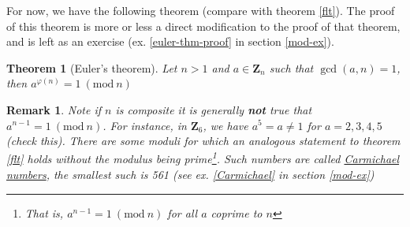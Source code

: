 \documentclass[12pt]{article}
\numberwithin{equation}{subsection}
\newtheorem{thm}[subsection]{Theorem}
\theoremstyle{note}
\newtheorem{remark}[subsection]{Remark}
\newcommand{\Mod}[1]{\ (\mathrm{mod}\ #1)}
\begin{document}
	
	For now, we have the following theorem (compare with theorem \ref{flt}). The proof of this theorem is more or less a direct modification to the proof of that theorem, and is left as an exercise (ex. \ref{euler-thm-proof} in section \ref{mod-ex}). 


\begin{thm}[Euler's theorem] \label{euler-thm-composite}
	Let $n>1$ and $a\in\mathbf{Z}_n$ such that $\gcd(a,n)=1$, then $a^{\varphi(n)}=1\Mod{n}$
\end{thm}

\begin{remark}
	Note if $n$ is composite it is generally \textbf{not} true that $a^{n-1}=1\Mod{n}$. For instance, in $\mathbf{Z}_6$, we have $a^{5}=a\neq 1$ for $a=2,3,4,5$ (check this). There are \textit{some} moduli for which an analogous statement to theorem \ref{flt} holds without the modulus being prime\footnote{That is, $a^{n-1}=1\Mod{n}$ for all $a$ coprime to $n$}. Such numbers are called \href{https://en.wikipedia.org/wiki/Carmichael_number}{\textit{Carmichael numbers}}, the smallest such is 561 (see ex. \ref{Carmichael} in section \ref{mod-ex})
\end{remark}	
\end{document}
